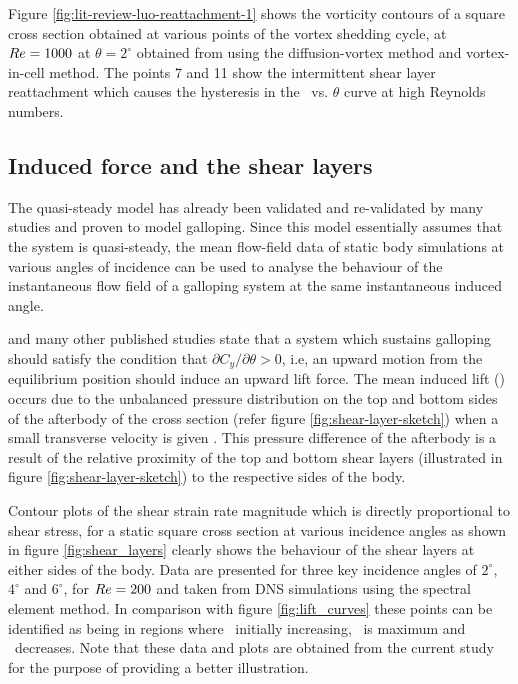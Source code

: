 

Figure \ref{fig:lit-review-luo-reattachment-1} shows the vorticity contours of a square cross section obtained at various points of the vortex shedding cycle, at $Re=1000$ at $\theta=2^{\circ}$ obtained from \citet{Luo2003}using the  diffusion-vortex method and vortex-in-cell method. The points 7 and 11 show the intermittent shear layer reattachment which causes the hysteresis in the \cy\ vs. $\theta$ curve at high Reynolds numbers.

\vspace{20mm}   

\subsection{Induced force and the shear layers}
\label{subsec:c_y and shear layers}

 The quasi-steady model has already been validated and re-validated by many studies \citep{Parkinson1964,Barrero-Gil2009,Luo2003} and proven to model galloping. Since this model essentially assumes that the system is quasi-steady, the mean flow-field data of static body simulations at various angles of incidence can be used to analyse the behaviour of the instantaneous flow field of a galloping system at the same instantaneous induced angle. 
 
 





\citet{Paidoussis2010,Parkinson1964,Barrero-Gil2010a} and many other published studies state that a system which sustains galloping should satisfy the condition that $\partial C_y/\partial \theta>0$, i.e, an upward motion from the equilibrium position should induce an upward lift force. The mean induced lift (\cy) occurs due to the unbalanced pressure distribution on the top and bottom sides of the afterbody of the cross section (refer figure \ref{fig:shear-layer-sketch}) when a small transverse velocity is given \citep{Parkinson1989}. This pressure difference of the afterbody is a result of the relative proximity of the top and bottom shear layers (illustrated in figure \ref{fig:shear-layer-sketch}) to the respective sides of the body. 

Contour plots of the shear strain rate magnitude which is directly proportional to shear stress, for a static square cross section at various incidence angles as shown in figure \ref{fig:shear_layers} clearly shows the behaviour of the shear layers at either sides of the body. Data are presented for three key incidence angles of $2^{\circ}$, $4^{\circ}$ and $6^{\circ}$, for $Re = 200$ and taken from DNS simulations using the spectral element method. In comparison with figure \ref{fig:lift_curves} these points can be identified as being in regions where \cy\ initially increasing, \cy\ is maximum and \cy\ decreases. Note that these data and plots are obtained from the current study for the purpose of providing a better illustration.

